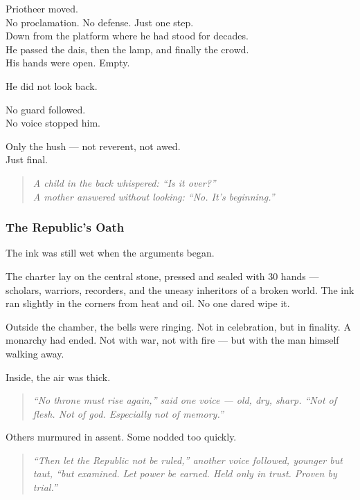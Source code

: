 \documentclass[12pt]{article}
\begin{document}
Priotheer moved.\\
No proclamation. No defense. Just one step.\\
Down from the platform where he had stood for decades.\\
He passed the dais, then the lamp, and finally the crowd.\\
His hands were open. Empty.

He did not look back.

No guard followed.\\
No voice stopped him.

Only the hush --- not reverent, not awed.\\
Just final.

\begin{quote}
\textit{A child in the back whispered: “Is it over?”}\\
\textit{A mother answered without looking: “No. It’s beginning.”}
\end{quote}

\dotfill

\subsubsection*{The Republic’s Oath}

The ink was still wet when the arguments began.

The charter lay on the central stone, pressed and sealed with 30 hands --- scholars, warriors, recorders, and the uneasy inheritors of a broken world. The ink ran slightly in the corners from heat and oil. No one dared wipe it.

Outside the chamber, the bells were ringing. Not in celebration, but in finality. A monarchy had ended. Not with war, not with fire --- but with the man himself walking away.

Inside, the air was thick.

\begin{quote}
\textit{“No throne must rise again,” said one voice --- old, dry, sharp. “Not of flesh. Not of god. Especially not of memory.”}
\end{quote}

Others murmured in assent. Some nodded too quickly.

\begin{quote}
\textit{“Then let the Republic not be ruled,” another voice followed, younger but taut, “but examined. Let power be earned. Held only in trust. Proven by trial.”}
\end{quote}
\end{document}
